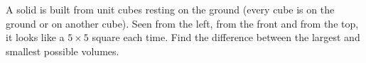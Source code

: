 A solid is built from unit cubes resting on the ground (every cube is on the ground or on another cube). Seen from the left, from the front and from the top, it looks like a $5\times5$ square each time. Find the difference between the largest and smallest possible volumes.

